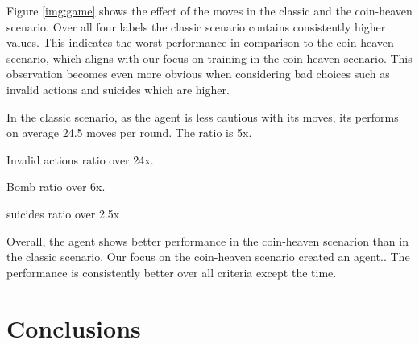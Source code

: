 \documentclass[
	letterpaper, %
	10pt, %
]{CSUniSchoolLabReport}
\begin{document}
Figure \ref{img:game} shows the effect of the moves in the classic and the coin-heaven
scenario. Over all four labels the classic scenario contains consistently higher values.
This indicates the worst performance in comparison to the coin-heaven scenario, which
aligns with our focus on training in the coin-heaven scenario.
This observation becomes even more obvious when considering bad choices such as invalid actions and suicides
which are higher.

In the classic scenario, as the agent is less cautious with its moves, its performs on average 24.5 moves per round.
The ratio is 5x.

Invalid actions ratio over 24x.

Bomb ratio over 6x.

suicides ratio over 2.5x

Overall, the agent shows better performance in the coin-heaven scenarion than in
the classic scenario. Our focus on the coin-heaven scenario created an agent..
The performance is consistently better over all criteria except the time.



\section{Conclusions}





\printbibliography %

\end{document}

